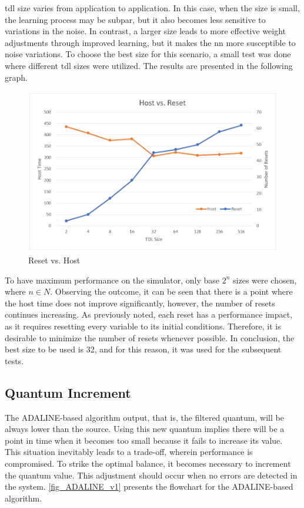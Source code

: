 \gls{tdl} size varies from application to application. In this case, when the size is small, the learning process may be subpar, but it also 
becomes less sensitive to variations in the noise. In contrast, a larger size leads to more effective weight adjustments through improved learning, 
but it makes the \gls{nn} more susceptible to noise variations. To choose the best size for this scenario, a small test was done where different 
\gls{tdl} sizes were utilized. The results are presented in the following graph.

\begin{figure}[H]
	\centering
 	\includegraphics[width=0.7\linewidth]{Images/ResetVsHost.png}
 	\caption{Reset vs. Host}
	 \label{fig_ResetVsHost}
\end{figure}

To have maximum performance on the simulator, only base $2^{n}$ sizes were chosen, where $n \in N$. Observing the outcome, it can be seen that 
there is a point where the host time does not improve significantly, however, the number of resets continues increasing. As previously noted, 
each reset has a 
performance impact, as it requires resetting every variable to its initial conditions. Therefore, it is desirable to minimize the number of 
resets whenever possible. In conclusion, the best size to be used is 32, and for this reason, it was used for the subsequent 
tests.

\subsection{Quantum Increment}

The ADALINE-based algorithm output, that is, the filtered quantum, will be always lower than the source. Using this new quantum implies there will 
be a point in time when it becomes too small because it fails to increase its value. This situation inevitably leads to a 
trade-off, wherein performance is compromised. To strike the optimal balance, it becomes necessary to increment the quantum value. This adjustment 
should occur when no errors are detected in the system. \autoref{fig_ADALINE_v1} presents the flowchart for the ADALINE-based algorithm.

